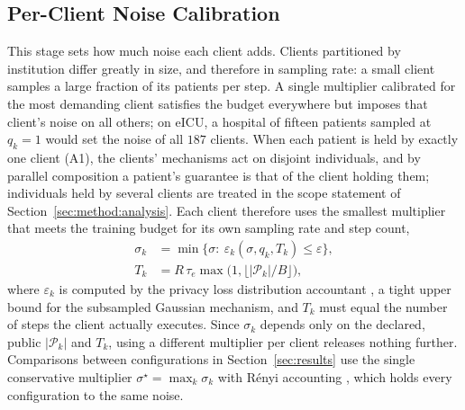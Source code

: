 \subsection{Per-Client Noise Calibration}
\label{sec:method:calib}
This stage sets how much noise each client adds. Clients partitioned by
institution differ greatly in size, and therefore in
sampling rate: a small client samples a large fraction of its patients per
step. A single multiplier calibrated for the most demanding client satisfies
the budget everywhere but imposes that client's noise on all others; on eICU,
a hospital of fifteen patients sampled at $q_k = 1$ would set the noise of all
$187$ clients. When each patient is held by exactly one client (A1), the
clients' mechanisms act on disjoint individuals, and by parallel composition a
patient's guarantee is that of the client holding them; individuals held by
several clients are treated in the scope statement of Section~\ref{sec:method:analysis}. Each client therefore
uses the smallest multiplier that meets the training budget for its own
sampling rate and step count,
\begin{equation}
\begin{aligned}
\sigma_k &= \min\big\{\sigma :\ \varepsilon_k(\sigma, q_k, T_k) \le \varepsilon\big\},\\
T_k &= R\,\tau_e \max\big(1, \lfloor |\mathcal{P}_k|/B \rfloor\big),
\end{aligned}
\label{eq:sigma}
\end{equation}
where $\varepsilon_k$ is computed by the privacy loss distribution accountant
\cite{ref33}, a tight upper bound for the subsampled Gaussian mechanism, and
$T_k$ must equal the number of steps the client actually executes. Since
$\sigma_k$ depends only on the declared, public $|\mathcal{P}_k|$ and $T_k$,
using a different multiplier per client releases nothing further. Comparisons between configurations in Section~\ref{sec:results} use the single conservative
multiplier $\sigma^{\star} = \max_k \sigma_k$ with R\'enyi accounting
\cite{ref7, ref29}, which holds every configuration to the same noise.

